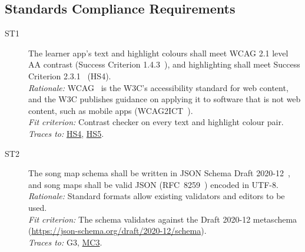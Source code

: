 \documentclass[12pt]{article}
\newcommand{\rat}[1]{\\\textit{Rationale:} #1}
\newcommand{\fit}[1]{\\\textit{Fit criterion:} #1}
\newcommand{\trace}[1]{\\\textit{Traces to:} #1}
\newcommand{\reqdef}[1]{\hypertarget{req:#1}{#1}}
\newcommand{\req}[1]{\hyperlink{req:#1}{#1}}
\begin{document}
\subsection{Standards Compliance Requirements} \label{SecStandards}
\begin{description}
\item[\reqdef{ST1}] The learner app's text and highlight colours shall meet WCAG 2.1
level AA contrast (Success Criterion 1.4.3~\cite{WCAG143}), and highlighting
shall meet Success Criterion 2.3.1~\cite{WCAG231} (HS4).
\rat{WCAG~\cite{WCAG21} is the W3C's accessibility standard for web content,
and the W3C publishes guidance on applying it to software that is not web
content, such as mobile apps (WCAG2ICT~\cite{WCAG2ICT}).}
\fit{Contrast checker on every text and highlight colour pair.}
\trace{\req{HS4}, \req{HS5}.}

\item[\reqdef{ST2}] The song map schema shall be written in JSON Schema Draft
2020-12~\cite{JSONSchema2020}, and song maps shall be valid JSON
(RFC~8259~\cite{RFC8259}) encoded in UTF-8.
\rat{Standard formats allow existing validators and editors to be used.}
\fit{The schema validates against the Draft 2020-12 metaschema
(\url{https://json-schema.org/draft/2020-12/schema}).}
\trace{G3, \req{MC3}.}
\end{description}
\end{document}
